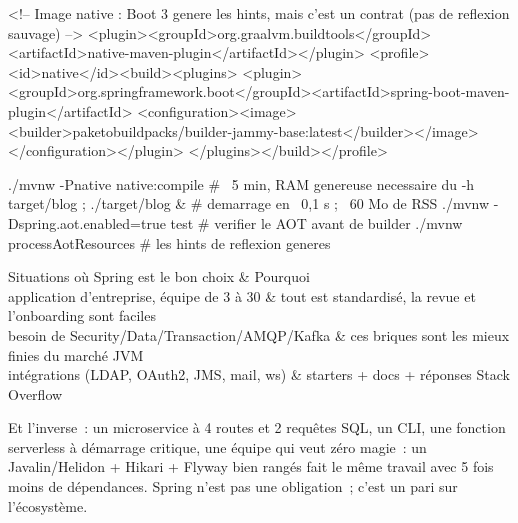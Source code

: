 \begin{codeconf}
<!-- Image native : Boot 3 genere les hints, mais c'est un contrat (pas de reflexion sauvage) -->
<plugin><groupId>org.graalvm.buildtools</groupId><artifactId>native-maven-plugin</artifactId></plugin>
<profile><id>native</id><build><plugins>
  <plugin><groupId>org.springframework.boot</groupId><artifactId>spring-boot-maven-plugin</artifactId>
    <configuration><image><builder>paketobuildpacks/builder-jammy-base:latest</builder></image></configuration></plugin>
</plugins></build></profile>
\end{codeconf}

\begin{terminal}
./mvnw -Pnative native:compile          # ~5 min, RAM genereuse necessaire
du -h target/blog ; ./target/blog &     # demarrage en ~0,1 s ; ~60 Mo de RSS
./mvnw -Dspring.aot.enabled=true test   # verifier le AOT avant de builder
./mvnw processAotResources              # les hints de reflexion generes
\end{terminal}

\begin{tablez}[p{0.3\textwidth}X]
  \headrow Situations o\`u Spring est le bon choix \& Pourquoi \\
  \midrule
  application d'entreprise, \'equipe de 3 \`a 30 \& tout est standardis\'e, la revue et l'onboarding sont faciles \\
  besoin de Security/Data/Transaction/AMQP/Kafka \& ces briques sont les mieux finies du march\'e JVM \\
  int\'egrations (LDAP, OAuth2, JMS, mail, ws) \& starters + docs + r\'eponses Stack Overflow \\
\end{tablez}
Et l'inverse~: un microservice \`a 4 routes et 2 requ\^etes SQL, un CLI, une fonction serverless \`a
d\'emarrage critique, une \'equipe qui veut z\'ero magie~: un Javalin/Helidon + Hikari + Flyway bien
rang\'es fait le m\^eme travail avec 5 fois moins de d\'ependances. Spring n'est pas une obligation~;
c'est un pari sur l'\'ecosyst\`eme.

